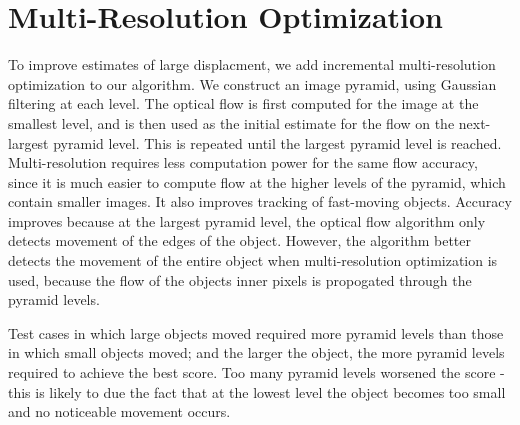 \documentclass[10pt,twocolumn,letterpaper]{article}
\begin{document}
\section{Multi-Resolution Optimization}
To improve estimates of large displacment, we add incremental multi-resolution optimization to our algorithm.  We construct an image pyramid, using Gaussian filtering at each level. The optical flow is first computed for the image at the smallest level, and is then used as the initial estimate for the flow on the next-largest pyramid level.  This is repeated until the largest pyramid level is reached. Multi-resolution requires less computation power for the same flow accuracy, since it is much easier to compute flow at the higher levels of the pyramid, which contain smaller images.  It also improves tracking of fast-moving objects.  Accuracy improves because at the largest pyramid level, the optical flow algorithm only detects movement of the edges of the object. However, the algorithm better detects the movement of the entire object when multi-resolution optimization is used, because the flow of the objects inner pixels is propogated through the pyramid levels.

Test cases in which large objects moved required more pyramid levels than those in which small objects moved; and the larger the object, the more pyramid levels required to achieve the best score. Too many pyramid levels worsened the score - this is likely to due the fact that at the lowest level the object becomes too small and no noticeable movement occurs.
\end{document}
